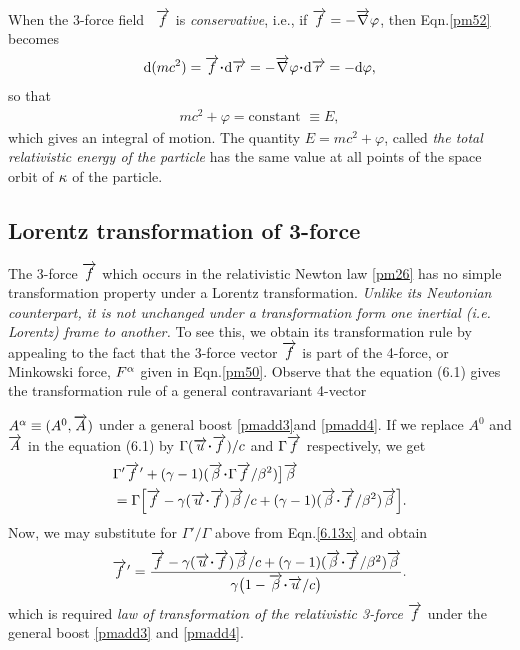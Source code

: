 When the 3-force field \ $\overrightarrow{f}$ is 
\textsl{conservative}, 
i.e., if $\overrightarrow{f}= - \overrightarrow{\nabla} \varphi$, then 
Eqn.\eqref{pm52}
becomes
\begin{align*}
 \dd (mc^2)=\veca{f}\dotp\dd{\veca{r}}=-\veca{\nabla}
\varphi\dotp\dd{\veca{r}}=-\dd\varphi,
\end{align*}
so that
\begin{align}
 mc^2+\varphi=\text{constant } \equiv E,
\end{align}
which gives an integral of motion. The quantity 
$E=mc^2+\varphi$, called \textsl{the total 
relativistic 
energy of the particle} has the same value at all 
points of 
the space orbit of ${\kappa}$ of the particle.

\subsection{Lorentz transformation of 3-force}
The 3-force $\overrightarrow{f}$ which occurs in the 
relativistic 
Newton law \eqref{pm26} has no simple transformation 
property under a  Lorentz transformation. 
\textsl{Unlike its 
Newtonian counterpart, it is not unchanged under a 
transformation form one inertial (i.e. Lorentz) frame 
to 
another.} To see this, we obtain its transformation 
rule by 
appealing to the fact that the 3-force vector 
$\overrightarrow{f}$ is 
part of the 4-force, or Minkowski force, $F^{{\alpha}}$ given 
in 
Eqn.\eqref{pm50}. Observe that the equation (6.1) gives 
the 
transformation rule of a general contravariant 4-vector 
 
$A^{{\alpha}}\equiv (A^0,\overrightarrow{A})$ under a general boost 
\eqref{pmadd3}and \eqref{pmadd4}. If we replace $A^0$ 
and 
$\overrightarrow{A}$ in the equation (6.1) by $\Gamma 
(\veca{u}\dotp\veca{f})/c$ and $\Gamma \overrightarrow{f}$ 
respectively, 
we get
\begin{align}
&\Gamma' \pvec{f}
% 
+(\gkg-1)(\veca{\gkb}\dotp\Gamma\veca{f}/\gkb^2)\big]
\veca{\gkb
}
\notag\\
&=\Gamma\Big[\veca{f}-\gkg
(\veca{u}\dotp\veca{f})\veca{\gkb}/c+(\gkg-1)(\veca{
\gkb}\dotp 
\veca{f}
/\gkb^2)\veca{\gkb} \Big].
\end{align}
Now, we may substitute for $\Gamma' /\Gamma$ above from
Eqn.\eqref{6.13x} and obtain
\begin{align}
\pvec{f}=\frac{\veca{f}-\gkg
(\veca{u}\dotp\veca{f})\veca{\gkb}/c+(\gkg-1)(\veca{
\gkb}\dotp 
\veca{f} /\gkb^2)\veca{\gkb}}{\gkg\big(1-\veca{\gkb}
\dotp\veca{u}/c\big) }.
\end{align}
which is required \textsl{law of transformation of the 
relativistic 3-force} $\overrightarrow{f}$ under the general 
boost  
\eqref{pmadd3} and \eqref{pmadd4}.

